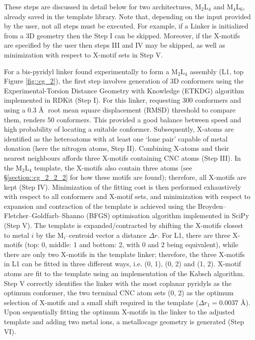 \documentclass[../../main.tex]{subfiles}
\newcommand{\MLf}{M$_2$L$_4$ }
\begin{document}
These steps are discussed in detail below for two architectures, \MLf and M$_4$L$_6$, already saved in the template library. Note that, depending on the input provided by the user, not all steps must be executed. For example, if a Linker is initialized from a 3D geometry then the Step I can be skipped. Moreover, if the X-motifs are specified by the user then steps III and IV may be skipped, as well as minimization with respect to X-motif sets in Step V.

For a bis-pyridyl linker found experimentally to form a \MLf assembly (L1, top Figure \ref{fig::cg_2}),\cite{MartCentelles2018} the first step involves generation of 3D conformers using the Experimental-Torsion Distance Geometry with Knowledge (ETKDG) algorithm\cite{Riniker2015} implemented in RDKit\cite{Landrum2019} (Step I). For this linker, requesting 300 conformers and using a 0.3 \AA$\;$ root mean square displacement (RMSD) threshold to compare them, renders 50 conformers. This provided a good balance between speed and high probability of locating a suitable conformer. Subsequently, X-atoms are identified as the heteroatoms with at least one ‘lone pair’ capable of metal donation (here the nitrogen atoms, Step II). Combining X-atoms and their nearest neighbours affords three X-motifs containing CNC atoms (Step III). In the \MLf template, the X-motifs also contain three atoms (see §\ref{section::cg_2_2_2} for how these motifs are found); therefore, all X-motifs are kept (Step IV). Minimization of the fitting cost is then performed exhaustively with respect to all conformers and X-motif sets, and minimization with respect to expansion and contraction of the template is achieved using the Broyden–Fletcher–Goldfarb–Shanno (BFGS) optimisation algorithm implemented in SciPy\cite{SciPy} (Step V). The template is expanded/contracted by shifting the X-motifs closest to metal $i$ by the M$_i$–centroid vector a distance $\Delta r$. For L1, there are three X-motifs (top: 0, middle: 1 and bottom: 2, with 0 and 2 being equivalent), while there are only two X-motifs in the template linker; therefore, the three X-motifs in L1 can be fitted in three different ways, i.e. (0, 1), (0, 2) and (1, 2). X-motif atoms are fit to the template using an implementation of the Kabsch algorithm.\cite{Kabsch1976} Step V correctly identifies the linker with the most coplanar pyridyls as the optimum conformer, the two terminal CNC atom sets (0, 2) as the optimum selection of X-motifs and a small shift required in the template ($\Delta r_1 = 0.0037$ \AA). Upon sequentially fitting the optimum X-motifs in the linker to the adjusted template and adding two metal ions, a metallocage geometry is generated (Step VI). 
\end{document}
